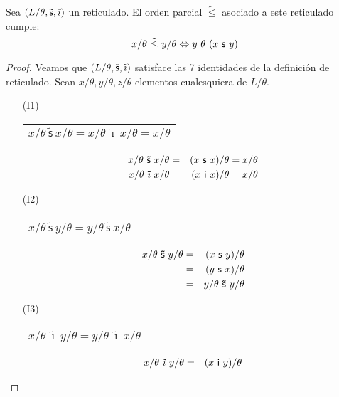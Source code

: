   \begin{lemma} \label{lemma_8}
    \PN Sea $(L/\theta, \mathsf{\tilde{s}}, \mathsf{\tilde{\imath}})$ un reticulado. El orden parcial $\tilde{\leq}$ asociado a este reticulado cumple:
    \[
      x/\theta \ \tilde{\leq} \ y/\theta \Leftrightarrow y \ \theta \ (x \ \SU \ y)
    \]
  \end{lemma}
  \begin{proof}
    \PN Veamos que $(L/\theta, \mathsf{\tilde{s}}, \mathsf{\tilde{\imath}})$ satisface las 7 identidades de la
    definición de reticulado. Sean $x/\theta, y/\theta, z/\theta$ elementos cualesquiera de $L/\theta$.
    \begin{multicols}{2}
      \begin{enumerate}
        \item[(I1)] \begin{tabular}{|c|} \hline $x/\theta \ \mathsf{\tilde{s}} \ x/\theta = x/\theta \
          \mathsf{\tilde{\imath}} \ x/\theta = x/\theta$ \\\hline \end{tabular}
          \begin{eqnarray*}
            x/\theta \ \mathsf{\tilde{s}} \ x/\theta &=& (x \ \SU \ x)/\theta = x /\theta \\
            x/\theta \ \mathsf{\tilde{\imath}} \ x/\theta &=& (x \ \IN \ x)/\theta = x /\theta
          \end{eqnarray*}
        \item[(I2)] \begin{tabular}{|c|} \hline $x/\theta \ \mathsf{\tilde{s}} \ y/\theta = y/\theta \
          \mathsf{\tilde{s}} \ x/\theta$ \\\hline \end{tabular}
          \begin{eqnarray*}
            x/\theta \ \mathsf{\tilde{s}} \ y/\theta &=& (x \ \SU \ y)/\theta \\
            &=& (y \ \SU \ x)/\theta \\
            &=& y/\theta \ \mathsf{\tilde{s}} \ y/\theta
          \end{eqnarray*}
        \item[(I3)] \begin{tabular}{|c|} \hline $x/\theta \ \mathsf{\tilde{\imath}} \ y/\theta = y/\theta \
          \mathsf{\tilde{\imath}} \ x/\theta$ \\\hline \end{tabular}
          \begin{eqnarray*}
            x/\theta \ \mathsf{\tilde{\imath}} \ y/\theta &=& (x \ \IN \ y)/\theta \\

\end{eqnarray*}
\end{enumerate}
\end{multicols}
\end{proof}
